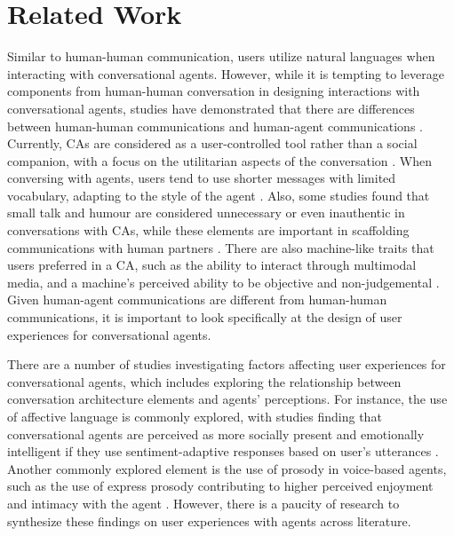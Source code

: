 
\section{Related Work}
Similar to human-human communication, users utilize natural languages when interacting with conversational agents. %
However, while it is tempting to leverage components from human-human conversation in designing interactions with conversational agents, studies have demonstrated that there are differences between human-human communications and human-agent communications \cite{clark2019makes, hill2015real}. Currently, CAs are considered as a user-controlled tool rather than a social companion, with a focus on the utilitarian aspects of the conversation \cite{clark2019makes}\cmt{[1]}. When conversing with agents, users tend to use shorter messages with limited vocabulary, adapting to the style of the agent \cite{hill2015real}. Also, some studies found that small talk and humour are considered unnecessary or even inauthentic in conversations with CAs, while these elements are important in scaffolding communications with human partners \cite{clark2019makes, doyle2019mapping}\cmt{[1],[2]}. There are also machine-like traits that users preferred in a CA, such as the ability to interact through multimodal media, and a machine's perceived ability to be objective and non-judgemental \cite{doyle2019mapping, kim2022understanding}\cmt{[2],[3]}. Given human-agent communications are different from human-human communications, it is important to look specifically at the design of user experiences for conversational agents.

There are a number of studies investigating factors affecting user experiences for conversational agents, which includes exploring the relationship between conversation architecture elements and agents' perceptions. For instance, the use of affective language is commonly explored, with studies finding that conversational agents are perceived as more socially present and emotionally intelligent if they use sentiment-adaptive responses based on user's utterances \cite{diederich2019emulating, yang2017perceived}. Another commonly explored element is the use of prosody in voice-based agents, such as the use of express prosody contributing to higher perceived enjoyment and intimacy with the agent \cite{kim2020can}. However, there is a paucity of research to synthesize these findings on user experiences with agents across literature. 


